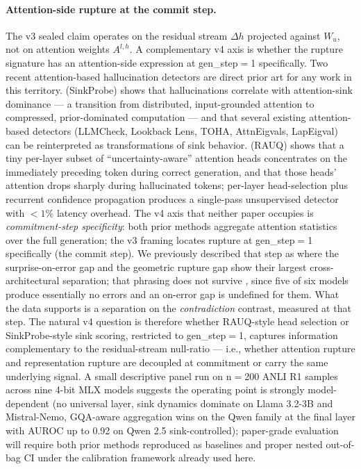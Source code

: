 \documentclass[10pt, letterpaper]{article}
\renewcommand{\dh}{\Delta h}
\begin{document}
\paragraph{Attention-side rupture at the commit step.}
The v3 sealed claim operates on the residual stream $\dh$ projected
against $W_u$, not on attention weights $A^{l,h}$. A complementary
v4 axis is whether the rupture signature has an attention-side
expression at gen\_step$=$1 specifically. Two recent attention-based
hallucination detectors are direct prior art for any work in this
territory. \citet{binkowski2026sinkprobe} (SinkProbe) shows that
hallucinations correlate with attention-sink dominance --- a
transition from distributed, input-grounded attention to compressed,
prior-dominated computation --- and that several existing
attention-based detectors (LLMCheck, Lookback Lens, TOHA, AttnEigvals,
LapEigval) can be reinterpreted as transformations of sink behavior.
\citet{rauq2026anonymous} (RAUQ) shows that a tiny per-layer subset of
``uncertainty-aware'' attention heads concentrates on the immediately
preceding token during correct generation, and that those heads'
attention drops sharply during hallucinated tokens; per-layer
head-selection plus recurrent confidence propagation produces a
single-pass unsupervised detector with $<1\%$ latency overhead.
The v4 axis that neither paper occupies is \emph{commitment-step
specificity}: both prior methods aggregate attention statistics over
the full generation; the v3 framing locates rupture at gen\_step$=$1
specifically (the commit step). We previously described that step
as where the surprise-on-error gap and the geometric rupture gap show
their largest cross-architectural separation; that phrasing does not
survive , since five of six models produce
essentially no errors and an on-error gap is undefined for them. What
the data supports is a separation on the \emph{contradiction} contrast,
measured at that step. The natural v4 question is therefore whether
RAUQ-style head selection or SinkProbe-style sink scoring, restricted
to gen\_step$=$1, captures information complementary to the
residual-stream null-ratio --- i.e., whether attention rupture and
representation rupture are decoupled at commitment or carry the same
underlying signal. A small descriptive panel run on n$=$200 ANLI R1
samples across nine 4-bit MLX models suggests the operating point is
strongly model-dependent (no universal layer, sink dynamics dominate
on Llama 3.2-3B and Mistral-Nemo, GQA-aware aggregation wins on the
Qwen family at the final layer with AUROC up to 0.92 on Qwen 2.5
sink-controlled); paper-grade evaluation will require both prior
methods reproduced as baselines and proper nested out-of-bag CI under
the calibration framework already used here.
\end{document}

